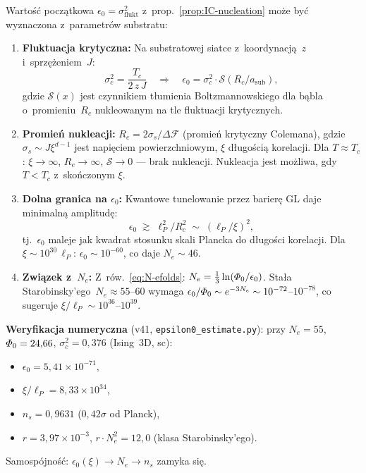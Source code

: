 \begin{remark}%
\label{rem:epsilon0-derivation}
Warto\'s\'c pocz\k{a}tkowa $\epsilon_0 = \sigma^2_{\mathrm{flukt}}$
z~prop.~\ref{prop:IC-nucleation} mo\.ze by\'c wyznaczona
z~parametr\'ow substratu:
\begin{enumerate}[nosep]
  \item \textbf{Fluktuacja krytyczna:}
    Na substratowej siatce z~koordynacj\k{a}~$z$ i~sprz\k{e}\.zeniem~$J$:
    \begin{equation}\label{eq:sigma-crit}
      \sigma^2_c = \frac{T_c}{2\,z\,J}
      \quad\Longrightarrow\quad
      \epsilon_0 = \sigma^2_c \cdot \mathcal{S}(R_c/a_\mathrm{sub}),
    \end{equation}
    gdzie $\mathcal{S}(x)$ jest czynnikiem t\l{}umienia Boltzmannowskiego
    dla b\k{a}bla o~promieniu~$R_c$ nukleowanym na tle
    fluktuacji krytycznych.
  \item \textbf{Promie\'n nukleacji:}
    $R_c = 2\sigma_s / \Delta\mathcal{F}$ (promie\'n krytyczny Colemana),
    gdzie $\sigma_s \sim J\xi^{d-1}$ jest napi\k{e}ciem
    powierzchniowym, $\xi$ d\l{}ugo\'sci\k{a} korelacji.
    Dla $T \approx T_c$: $\xi \to \infty$,
    $R_c \to \infty$, $\mathcal{S} \to 0$ --- brak
    nukleacji. Nukleacja jest mo\.zliwa, gdy $T < T_c$
    z~sko\'nczonym $\xi$.
  \item \textbf{Dolna granica na $\epsilon_0$:}
    Kwantowe tunelowanie przez barier\k{e} GL daje minimaln\k{a}
    amplitud\k{e}:
    \begin{equation}\label{eq:eps0-bound}
      \epsilon_0 \;\gtrsim\; \ell_P^2 / R_c^2
      \;\sim\; (\ell_P / \xi)^2,
    \end{equation}
    tj.\ $\epsilon_0$ maleje jak kwadrat stosunku
    skali Plancka do d\l{}ugo\'sci korelacji.
    Dla $\xi \sim 10^{30}\,\ell_P$:
    $\epsilon_0 \sim 10^{-60}$, co daje $N_e \sim 46$.
  \item \textbf{Zwi\k{a}zek z~$N_e$:}
    Z~r\'ow.~\eqref{eq:N-efolds}:
    $N_e = \frac{1}{3}\ln(\varPhi_0/\epsilon_0)$.
    Sta\l{}a Starobinsky'ego~$N_e \approx 55$--$60$
    wymaga $\epsilon_0 / \varPhi_0 \sim e^{-3N_e}
    \sim 10^{-72}$--$10^{-78}$,
    co sugeruje $\xi / \ell_P \sim 10^{36}$--$10^{39}$.
\end{enumerate}

\smallskip\noindent
\textbf{Weryfikacja numeryczna} (v41, \texttt{epsilon0\_estimate.py}):
przy $N_e = 55$, $\varPhi_0 = 24{,}66$, $\sigma^2_c = 0{,}376$ (Ising~3D, sc):
\begin{itemize}[nosep]
  \item $\epsilon_0 = 5{,}41 \times 10^{-71}$,
  \item $\xi/\ell_P = 8{,}33 \times 10^{34}$,
  \item $n_s = 0{,}9631$ ($0{,}42\sigma$ od Planck),
  \item $r = 3{,}97 \times 10^{-3}$, $r \cdot N_e^2 = 12{,}0$
    (klasa Starobinsky'ego).
\end{itemize}
Samospójność: $\epsilon_0(\xi) \to N_e \to n_s$ zamyka się.


\end{remark}
